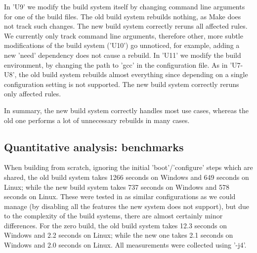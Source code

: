 In \lst'U9' we modify the build system itself by changing command line
arguments for one of the build files. The old build system rebuilds nothing,
as Make does not track such changes. The new build system correctly reruns all
affected rules. We currently only track command line arguments, therefore other,
more subtle modifications of the build system (\lst'U10') go unnoticed, for
example, adding a new \lst'need' dependency does not cause a rebuild.
In \lst'U11' we modify the build environment, by changing the path to \lst'gcc'
in the configuration file. As in \lst'U7-U8', the old build system rebuilds
almost everything since depending on a single configuration setting is not
supported. The new build system correctly reruns only affected rules.

%
%

In summary, the new build system correctly handles most use cases, whereas
the old one performs a lot of unnecessary rebuilds in many cases.

\vspace{-1mm}
\subsection{Quantitative analysis: benchmarks\label{sec:benchmarks}}

When building from scratch, ignoring the initial \lst'boot'/\lst'configure'
steps which are shared, the old build system takes 1266 seconds on Windows and
649 seconds on Linux; while the new build system takes 737 seconds on Windows and
578 seconds on Linux. These were tested in as similar configurations as we could
manage (by disabling all the features the new system does not support),
but due to the complexity of the build systems, there are almost certainly
minor differences. For the zero build, the old build system takes 12.3
seconds on Windows and 2.2 seconds on Linux; while the new one takes
2.1 seconds on Windows and 2.0 seconds on Linux. All measurements were collected
using \lst'-j4'.

